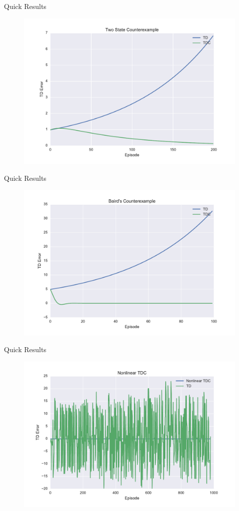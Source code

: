 \documentclass{beamer}
\begin{document}
\begin{frame}{Quick Results}
  \begin{figure}
    \includegraphics[width=0.7\linewidth]{2State.pdf}
  \end{figure}
\end{frame}
\begin{frame}{Quick Results}
  \begin{figure}
    \includegraphics[width=0.7\linewidth]{Baird.pdf}
  \end{figure}
\end{frame}
\begin{frame}{Quick Results}
  \begin{figure}
    \includegraphics[width=0.7\linewidth]{NonLinTDC.pdf}
  \end{figure}
\end{frame}
\end{document}
